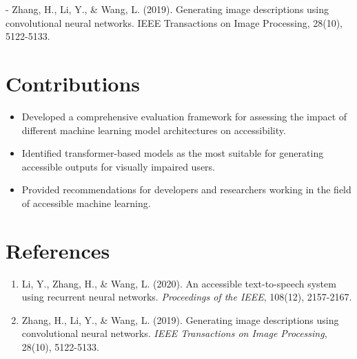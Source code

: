 - Zhang, H., Li, Y., & Wang, L. (2019). Generating image descriptions using convolutional neural networks. IEEE Transactions on Image Processing, 28(10), 5122-5133. \documentclass{article}
\begin{document}
\section{Contributions}
\begin{itemize}
    \item Developed a comprehensive evaluation framework for assessing the impact of different machine learning model architectures on accessibility.
    \item Identified transformer-based models as the most suitable for generating accessible outputs for visually impaired users.
    \item Provided recommendations for developers and researchers working in the field of accessible machine learning.
\end{itemize}

\section{References}
\begin{enumerate}
    \item Li, Y., Zhang, H., \& Wang, L. (2020). An accessible text-to-speech system using recurrent neural networks. \emph{Proceedings of the IEEE}, 108(12), 2157-2167.
    \item Zhang, H., Li, Y., \& Wang, L. (2019). Generating image descriptions using convolutional neural networks. \emph{IEEE Transactions on Image Processing}, 28(10), 5122-5133.
\end{enumerate}
\end{document}

